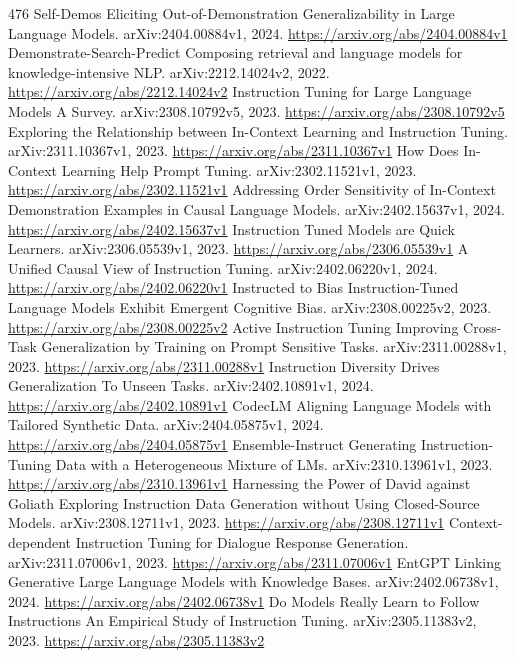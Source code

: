 \documentclass[11pt]{article}
\begin{document}
\begin{thebibliography}{476}
 Self-Demos Eliciting Out-of-Demonstration Generalizability in Large Language Models. arXiv:2404.00884v1, 2024. \url{https://arxiv.org/abs/2404.00884v1}
 Demonstrate-Search-Predict Composing retrieval and language models for knowledge-intensive NLP. arXiv:2212.14024v2, 2022. \url{https://arxiv.org/abs/2212.14024v2}
 Instruction Tuning for Large Language Models A Survey. arXiv:2308.10792v5, 2023. \url{https://arxiv.org/abs/2308.10792v5}
 Exploring the Relationship between In-Context Learning and Instruction Tuning. arXiv:2311.10367v1, 2023. \url{https://arxiv.org/abs/2311.10367v1}
 How Does In-Context Learning Help Prompt Tuning. arXiv:2302.11521v1, 2023. \url{https://arxiv.org/abs/2302.11521v1}
 Addressing Order Sensitivity of In-Context Demonstration Examples in Causal Language Models. arXiv:2402.15637v1, 2024. \url{https://arxiv.org/abs/2402.15637v1}
 Instruction Tuned Models are Quick Learners. arXiv:2306.05539v1, 2023. \url{https://arxiv.org/abs/2306.05539v1}
 A Unified Causal View of Instruction Tuning. arXiv:2402.06220v1, 2024. \url{https://arxiv.org/abs/2402.06220v1}
 Instructed to Bias Instruction-Tuned Language Models Exhibit Emergent Cognitive Bias. arXiv:2308.00225v2, 2023. \url{https://arxiv.org/abs/2308.00225v2}
 Active Instruction Tuning Improving Cross-Task Generalization by Training on Prompt Sensitive Tasks. arXiv:2311.00288v1, 2023. \url{https://arxiv.org/abs/2311.00288v1}
 Instruction Diversity Drives Generalization To Unseen Tasks. arXiv:2402.10891v1, 2024. \url{https://arxiv.org/abs/2402.10891v1}
 CodecLM Aligning Language Models with Tailored Synthetic Data. arXiv:2404.05875v1, 2024. \url{https://arxiv.org/abs/2404.05875v1}
 Ensemble-Instruct Generating Instruction-Tuning Data with a Heterogeneous Mixture of LMs. arXiv:2310.13961v1, 2023. \url{https://arxiv.org/abs/2310.13961v1}
 Harnessing the Power of David against Goliath Exploring Instruction Data Generation without Using Closed-Source Models. arXiv:2308.12711v1, 2023. \url{https://arxiv.org/abs/2308.12711v1}
 Context-dependent Instruction Tuning for Dialogue Response Generation. arXiv:2311.07006v1, 2023. \url{https://arxiv.org/abs/2311.07006v1}
 EntGPT Linking Generative Large Language Models with Knowledge Bases. arXiv:2402.06738v1, 2024. \url{https://arxiv.org/abs/2402.06738v1}
 Do Models Really Learn to Follow Instructions An Empirical Study of Instruction Tuning. arXiv:2305.11383v2, 2023. \url{https://arxiv.org/abs/2305.11383v2}

\end{thebibliography}
\end{document}
